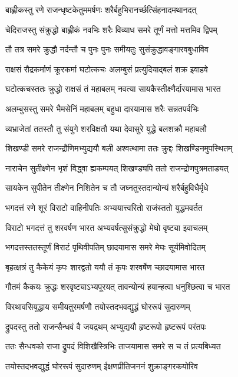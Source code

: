 \twolineshloka
{बाह्लीकस्तु रणे राजन्धृष्टकेतुममर्षणः}
{शरैर्बहुभिरानर्च्छत्सिंहनादमथानदत्}


\twolineshloka
{चेदिराजस्तु संक्रुद्धो बाह्लीकं नवभिः शरैः}
{विव्याध समरे तूर्णं मत्तो मत्तमिव द्विपम्}


\twolineshloka
{तौ तत्र समरे क्रुद्धौ नर्दन्तौ च पुनः पुनः}
{समीयतुः सुसंक्रुद्धावङ्गारवबुधाविव}


\twolineshloka
{राक्षसं रौद्रकर्माणं क्रूरकर्मा घटोत्कचः}
{अलम्बुसं प्रत्युदियाद्बलं शक्र इवाहवे}


\twolineshloka
{घटोत्कचस्ततः क्रुद्धो राक्षसं तं महाबलम्}
{नवत्या सायकैस्तीक्ष्णैर्दारयामास भारत}


\twolineshloka
{अलम्बुसस्तु समरे भैमसेनिं महाबलम्}
{बहुधा दारयामास शरैः सन्नतपर्वभिः}


\twolineshloka
{व्यभ्राजेतां ततस्तौ तु संयुगे शरविक्षतौ}
{यथा देवासुरे युद्धे बलशक्रौ महाबलौ}


\twolineshloka
{शिखण्डी समरे राजन्द्रौणिमभ्युद्ययौ बली}
{अश्वत्थामा ततः क्रुद्दः शिखण्डिनमुपस्थितम्}


\twolineshloka
{नाराचेन सुतीक्ष्णेन भृशं विद्ध्वा ह्यकम्पयत्}
{शिखण्ड्यपि ततो राजन्द्रोणपुत्रमताडयत्}


\twolineshloka
{सायकेन सुपीतेन तीक्ष्णेन निशितेन च}
{तौ जघ्नतुस्तदान्योन्यं शरैर्बहुविधैर्मृधे}


\twolineshloka
{भगदत्तं रणे शूरं विराटो वाहिनीपतिः}
{अभ्ययात्त्वरितो राजंस्ततो युद्धमवर्तत}


\twolineshloka
{विराटो भगदत्तं तु शरवर्षण भारत}
{अभ्यवर्षत्सुसंक्रुद्धो मेघो वृष्ट्या इवाचलम्}


\twolineshloka
{भगदत्तस्ततस्तूर्णं विराटं पृथिवीपतिम्}
{छादयामास समरे मेघः सूर्यमिवोदितम्}


\twolineshloka
{बृहत्क्षत्रं तु कैकेयं कृपः शारद्वतो ययौ}
{तं कृपः शरवर्षेण च्छादयामास भारत}


\twolineshloka
{गौतमं कैकयः क्रुद्धः शरवृष्ट्याऽभ्यपूरयत्}
{तावन्योन्यं हयान्हत्वा धनुश्छित्वा च भारत}


\twolineshloka
{विरथावसियुद्धाय समीयतुरमर्षणौ}
{तयोस्तदभवद्युद्धं घोररूपं सुदारुणम्}


\twolineshloka
{द्रुपदस्तु ततो राजन्सैन्धवं वै जयद्रथम्}
{अभ्युद्ययौ हृष्टरूपो हृष्टरूपं परंतपः}


\twolineshloka
{ततः सैन्धवको राजा द्रुपदं विशिखैस्त्रिभिः}
{ताजयामास समरे स च तं प्रत्यबिध्यत}


\twolineshloka
{तयोस्तदभवद्युद्धं घोररूपं सुदारुणम्}
{ईक्षणप्रीतिजननं शुक्राङ्गरकयोरिव}


